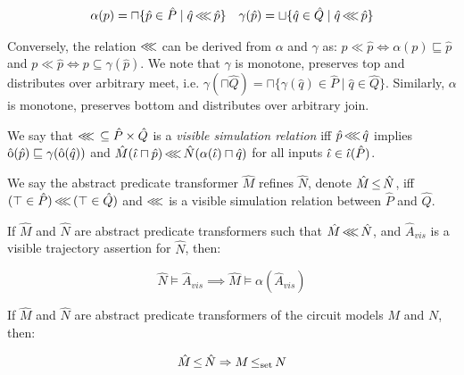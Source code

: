 \begin{align*}
\alpha(p) = \sqcap \{ \hat p \in \hat P \mid \hat q \operatorname{\lll} \hat p \} && \gamma(\hat p) = \sqcup \{ \hat q \in \hat Q \mid \hat q \operatorname{\lll} \hat p \}
\end{align*}

\noindent Conversely, the relation $\operatorname{\lll}$ can be derived from $\alpha$ and $\gamma$ as: $p \ll \hat p \iff \alpha(p) \sqsubseteq \hat p$ and $p \ll \hat p \iff p \subseteq \gamma(\hat p)$. We note that $\gamma$ is monotone, preserves top and distributes over arbitrary meet, i.e. $\gamma(\sqcap \hat Q) = \sqcap \{ \gamma(\hat q) \in \hat P \mid \hat q \in \hat Q\}$. Similarly, $\alpha$ is monotone, preserves bottom and distributes over arbitrary join.

We say that $\operatorname{\lll} \, \subseteq \hat P \times \hat Q$ is a \textit{visible simulation relation} iff $\hat p \operatorname{\lll} \hat q$ implies $\operatorname{\hat{\mathrm{o}}}(\hat p) \sqsubseteq \gamma(\operatorname{\hat{\mathrm{o}}}(\hat q))$ and $\hat M(\hat \iota \sqcap \hat p) \operatorname{\lll} \hat N(\alpha(\hat \iota) \sqcap \hat q)$ for all inputs $\hat \iota \in \operatorname{\hat{\iota}}(\hat P)$.

We say the abstract predicate transformer $\hat M$ refines $\hat N$, denote $\hat M \operatorname{\leq} \hat N$, iff $(\top \in \hat P) \operatorname{\lll} \, (\top \in \hat Q)$ and $\operatorname{\lll}$ is a visible simulation relation between $\hat P$ and $\hat Q$.


\begin{theorem} \label{thm:refinement-lat}
If $\hat M$ and $\hat N$ are abstract predicate transformers such that $\hat M \operatorname{\lll} \hat N$, and $\hat A_{vis}$ is a visible trajectory assertion for $\hat N$, then:

\begin{equation*}
\hat N \models \hat A_{vis} \implies \hat M \models \alpha(\hat A_{vis})
\end{equation*}
\end{theorem}

\begin{theorem} \label{thm:refinement-impl}
If $\hat M$ and $\hat N$ are abstract predicate transformers of the circuit models $M$ and $N$, then:

\begin{equation*}
\hat M \operatorname{\leq} \hat N \Rightarrow M \operatorname{\leq_{\textrm{set}}} N
\end{equation*}
\end{theorem}
